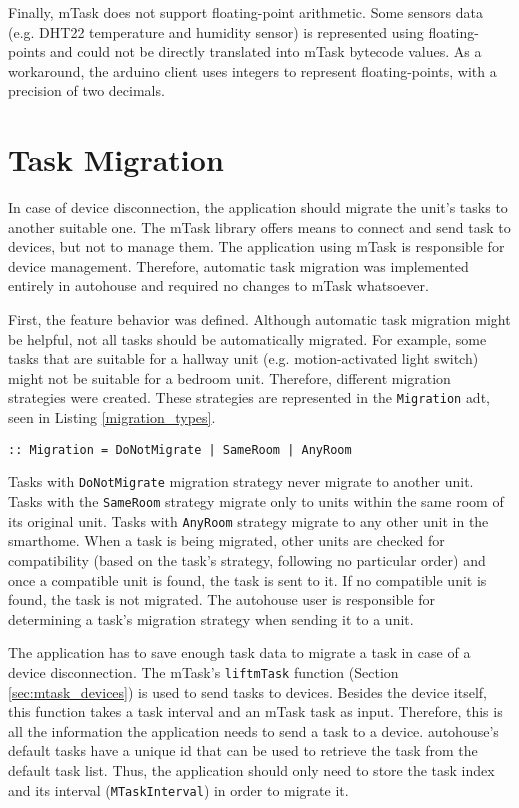 Finally, \gls{mTask} does not support floating-point arithmetic. Some sensors data (e.g. DHT22 temperature and humidity sensor) is represented using floating-points and could not be directly translated into \gls{mTask} bytecode values. As a workaround, the \gls{arduino} client uses integers to represent floating-points, with a precision of two decimals. 

\section{Task Migration}\label{sec:task_migration}

In case of device disconnection, the application should migrate the unit's tasks to another suitable one. The \gls{mTask} library offers means to connect and send task to devices, but not to manage them. The application using \gls{mTask} is responsible for device management. Therefore, automatic task migration was implemented entirely in \gls{autohouse} and required no changes to \gls{mTask} whatsoever.

First, the feature behavior was defined. Although automatic task migration might be helpful, not all tasks should be automatically migrated. For example, some tasks that are suitable for a hallway unit (e.g. motion-activated light switch) might not be suitable for a bedroom unit. Therefore, different migration strategies were created. These strategies are represented in the \texttt{Migration} \acs{adt}, seen in Listing \ref{migration_types}. 

\begin{lstlisting}[caption=Task migration strategies of \gls{autohouse},captionpos=b,label=migration_types]
:: Migration = DoNotMigrate | SameRoom | AnyRoom
\end{lstlisting}

Tasks with \texttt{DoNotMigrate} migration strategy never migrate to another unit. Tasks with the \texttt{SameRoom} strategy migrate only to units within the same room of its original unit. Tasks with \texttt{AnyRoom} strategy migrate to any other unit in the smarthome. When a task is being migrated, other units are checked for compatibility (based on the task's strategy, following no particular order) and once a compatible unit is found, the task is sent to it. If no compatible unit is found, the task is not migrated. The \gls{autohouse} user is responsible for determining a task's migration strategy when sending it to a unit.

The application has to save enough task data to migrate a task in case of a device disconnection. The \gls{mTask}'s \texttt{liftmTask} function (Section \ref{sec:mtask_devices}) is used to send tasks to devices. Besides the device itself, this function takes a task interval and an \gls{mTask} task as input. Therefore, this is all the information the application needs to send a task to a device. \gls{autohouse}'s default tasks have a unique id that can be used to retrieve the task from the default task list. Thus, the application should only need to store the task index and its interval (\texttt{MTaskInterval}) in order to migrate it. 

